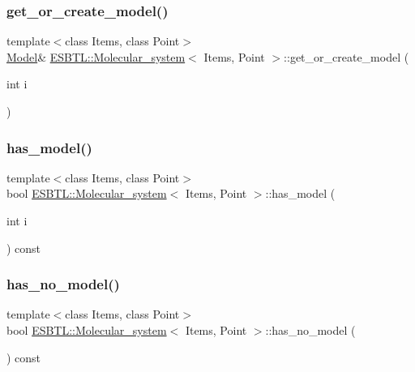 \subsubsection{\texorpdfstring{get\+\_\+or\+\_\+create\+\_\+model()}{get\_or\_create\_model()}}
{\footnotesize\ttfamily template$<$class Items, class Point$>$ \\
\hyperlink{classESBTL_1_1Molecular__system_ac99c9f22457fd0498324fb5cfc276227}{Model}\& \hyperlink{classESBTL_1_1Molecular__system}{E\+S\+B\+T\+L\+::\+Molecular\+\_\+system}$<$ Items, Point $>$\+::get\+\_\+or\+\_\+create\+\_\+model (\begin{DoxyParamCaption}\item[{int}]{i }\end{DoxyParamCaption})\hspace{0.3cm}{\ttfamily [inline]}}

\mbox{\label{classESBTL_1_1Molecular__system_a0a25e5aa6ec89a0746e1857bf7447ea7}} 
\subsubsection{\texorpdfstring{has\+\_\+model()}{has\_model()}}
{\footnotesize\ttfamily template$<$class Items, class Point$>$ \\
bool \hyperlink{classESBTL_1_1Molecular__system}{E\+S\+B\+T\+L\+::\+Molecular\+\_\+system}$<$ Items, Point $>$\+::has\+\_\+model (\begin{DoxyParamCaption}\item[{int}]{i }\end{DoxyParamCaption}) const\hspace{0.3cm}{\ttfamily [inline]}}

\mbox{\label{classESBTL_1_1Molecular__system_a04ee4e4634a83c4dc8c84d3c9ef6a155}} 
\subsubsection{\texorpdfstring{has\+\_\+no\+\_\+model()}{has\_no\_model()}}
{\footnotesize\ttfamily template$<$class Items, class Point$>$ \\
bool \hyperlink{classESBTL_1_1Molecular__system}{E\+S\+B\+T\+L\+::\+Molecular\+\_\+system}$<$ Items, Point $>$\+::has\+\_\+no\+\_\+model (\begin{DoxyParamCaption}{ }\end{DoxyParamCaption}) const\hspace{0.3cm}{\ttfamily [inline]}}

